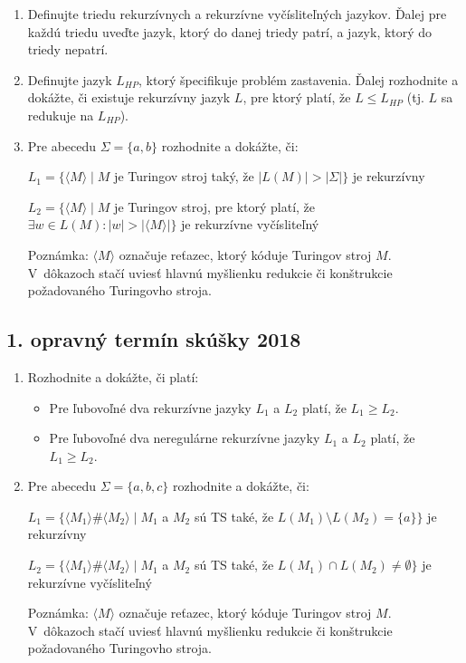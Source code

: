 \documentclass[11pt,a4paper]{article}
\begin{document}
		\begin{enumerate}
			\item Definujte triedu rekurzívnych a rekurzívne vyčísliteľných jazykov. Ďalej pre každú triedu uveďte jazyk, ktorý do danej triedy patrí, a jazyk, ktorý do triedy nepatrí.

			\item Definujte jazyk $L_{HP}$, ktorý špecifikuje problém zastavenia. Ďalej rozhodnite a dokážte, či existuje rekurzívny jazyk $L$, pre ktorý platí, že $L \leq L_{HP}$ (tj. $L$ sa redukuje na $L_{HP}$).
	
			\item Pre abecedu $\Sigma = \{a, b\}$ rozhodnite a dokážte, či:
	
			$L_1 = \{\langle M \rangle \mid M$ je Turingov stroj taký, že $\vert L(M) \vert  > \vert \Sigma \vert\}$ je rekurzívny
	
			$L_2 = \{\langle M \rangle \mid M$ je Turingov stroj, pre ktorý platí, že $\exists w \in L(M) : \vert w \vert > \vert \langle M \rangle \vert\}$ je rekurzívne vyčísliteľný
	
			Poznámka: $\langle M \rangle$ označuje reťazec, ktorý kóduje Turingov stroj $M$. V~dôkazoch stačí uviesť hlavnú myšlienku redukcie či konštrukcie požadovaného Turingovho stroja.
		\end{enumerate}	
	
		\subsection{1. opravný termín skúšky 2018}
		
		\begin{enumerate}
			\item Rozhodnite a dokážte, či platí:
			\begin{itemize}
				\item Pre ľubovoľné dva rekurzívne jazyky $L_1$ a $L_2$ platí, že $L_1 \geq L_2$.
				\item Pre ľubovoľné dva neregulárne rekurzívne jazyky $L_1$ a $L_2$ platí, že $L_1 \geq L_2$.
			\end{itemize}
		
			\item Pre abecedu $\Sigma = \{a, b, c\}$ rozhodnite a dokážte, či:
			
			$L_1 = \{\langle M_1 \rangle \# \langle M_2 \rangle \mid M_1$ a $M_2$  sú TS také, že $L(M_1) \setminus L(M_2) = \{a\}\}$ je rekurzívny
			
			$L_2 = \{\langle M_1 \rangle \# \langle M_2 \rangle \mid M_1$ a $M_2$  sú TS také, že $L(M_1) \cap L(M_2) \neq \emptyset\}$ je rekurzívne vyčísliteľný
			
			Poznámka: $\langle M \rangle$ označuje reťazec, ktorý kóduje Turingov stroj $M$. V~dôkazoch stačí uviesť hlavnú myšlienku redukcie či konštrukcie požadovaného Turingovho stroja.
		\end{enumerate}	
\end{document}
